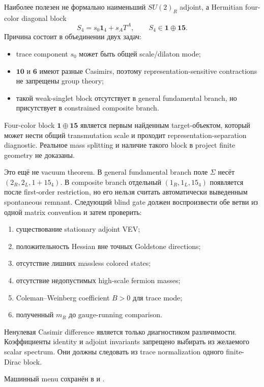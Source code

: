 Наиболее полезен не формально наименьший \(SU(2)_R\) adjoint, а Hermitian
four-color diagonal block
\begin{equation}
 S_4=s_0\mathbf1_4+s_A T^A,
 \qquad
 S_4\in\mathbf1\oplus\mathbf{15}.
\end{equation}
Причина состоит в объединении двух задач:
\begin{itemize}
 \item trace component \(s_0\) может быть общей scale/dilaton mode;
 \item \(\mathbf{10}\) и \(\mathbf6\) имеют разные Casimirs, поэтому
 representation-sensitive contractions не запрещены group theory;
 \item такой weak-singlet block отсутствует в general fundamental branch,
 но присутствует в constrained composite branch.
\end{itemize}

\begin{proposition}
Four-color block \(\mathbf1\oplus\mathbf{15}\) является первым найденным
target-объектом, который может нести общий transmutation scale и проходит
representation-separation diagnostic. Реальное mass splitting и наличие
такого block в project finite geometry не доказаны.
\end{proposition}

Это ещё не vacuum theorem. В general fundamental branch поле \(\Sigma\)
несёт \((2_R,2_L,1+15_4)\). В composite branch отдельный
\((1_R,1_L,15_4)\) появляется после first-order restriction, но его нельзя
считать автоматически выведенным spontaneous remnant. Следующий blind gate
должен воспроизвести обе ветви из одной matrix convention и затем
проверить:
\begin{enumerate}
 \item существование stationary adjoint VEV;
 \item положительность Hessian вне точных Goldstone directions;
 \item отсутствие лишних massless colored states;
 \item отсутствие недопустимых high-scale fermion masses;
 \item Coleman--Weinberg coefficient \(B>0\) для trace mode;
 \item полученный \(m_R\) до gauge-running comparison.
\end{enumerate}

\begin{nogocriterion}
Ненулевая Casimir difference является только диагностиком различимости.
Коэффициенты identity и adjoint invariants запрещено выбирать из желаемого
scalar spectrum. Они должны следовать из trace normalization одного
finite-Dirac block.
\end{nogocriterion}

Машинный menu сохранён в
 и
.